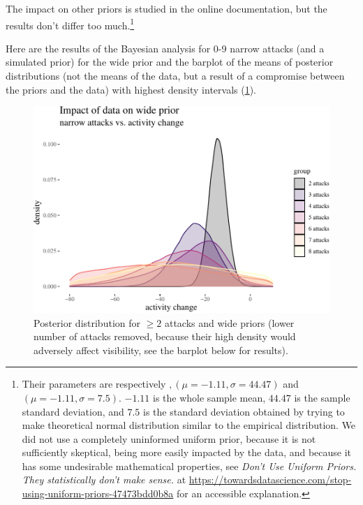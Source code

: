 \documentclass[10pt,dvipsnames]{scrartcl}
\begin{document}
\noindent  The impact on other priors is studied in the online
documentation, but the results don't differ too
much.\footnote{Their  parameters are respectively $, (\mu = -1.11, \sigma = 44.47)$ and $(\mu = -1.11, \sigma = 7.5)$.   $-1.11$ is the whole sample mean, $44.47$ is the sample standard deviation, and $7.5$ is the standard deviation obtained by  trying to make  theoretical normal distribution similar to the empirical distribution. We did not use  a completely uninformed uniform prior, because it is  not sufficiently skeptical, being more easily impacted by the data, and because it has some undesirable mathematical properties, see \emph{Don’t Use Uniform Priors. They statistically don’t make sense.} at \url{https://towardsdatascience.com/stop-using-uniform-priors-47473bdd0b8a} for an accessible explanation.}

\normalsize

\footnotesize

\normalsize

Here are the results of the Bayesian analysis for 0-9 narrow attacks
(and a simulated prior) for the wide prior and the barplot of the means
of posterior distributions (not the means of the data, but a result of a
compromise between the priors and the data) with highest density
intervals (\ref{fig:bayesian1}).

\begin{figure}[H]

\begin{center}\includegraphics[width=1\linewidth]{quittingShortAbridgedRevisions2_files/figure-latex/unnamed-chunk-25-1} \end{center}
\caption{Posterior distribution for $\geq 2$ attacks and wide priors (lower number of attacks removed, because their high density would adversely affect visibility, see the barplot below for results).}
\label{fig:bayesian1}

\end{figure}
\end{document}
